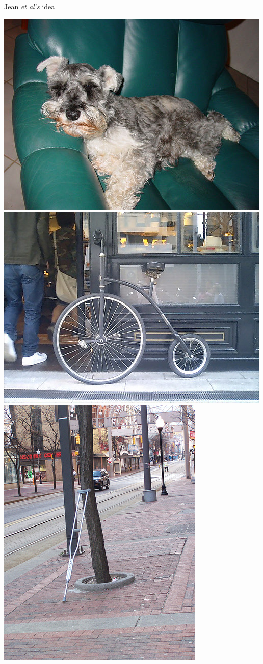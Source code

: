 \documentclass[mathserif, aspectratio=169]{beamer}
\begin{document}
\begin{frame}{Jean \textit{et al's} idea}
\begin{enumerate}
\begin{itemize}
\includegraphics[height=0.3\textheight]{schnauzer} \;\includegraphics[height=0.3\textheight]{boneshaker}\;\includegraphics[height=0.3\textheight]{crutch.jpg}


\end{itemize}
\end{enumerate}
\end{frame}
\end{document}
